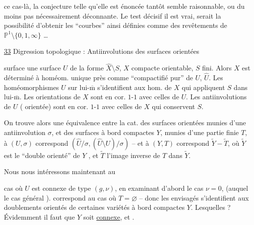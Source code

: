  ce cas-là, la conjecture telle qu'elle est énoncée tantôt semble raisonnable, ou du moins pas nécessairement déconnante. Le test décisif\unsure{,|,:} il est vrai, serait la possibilité d'obtenir les ``courbes'' ainsi définies comme des revêtements de $\mathbb{P}^1\setminus\{0,1,\infty\}$ \ldots


\uline{33} Digression topologique :
Antiinvolutions des surfaces orientées 


 surface  une surface $U$ de la forme $\widehat X\setminus S$, $X$  compacte orientable, $S$ fini. Alors $X$ est déterminé à homéom. unique près comme ``compactifié pur'' de $U$,  $\widehat U$.  Les homéomorphismes $U$ sur lui-$\overline{\mathrm m}$ s'identifient aux hom. de $X$ qui appliquent $S$ dans lui-$\overline{\mathrm m}$. Les orientations de $X$ sont en cor. $1$-$1$ avec celles de $U$. Les antiinvolutions de $U$ ( orientée) sont en cor. $1$-$1$ avec celles de $X$ qui conservent $S$.

On trouve alors une équivalence entre la cat. des surfaces orientées   munies d'une antiinvolution $\sigma$, et des surfaces à bord compactes $Y$, munies d'une partie finie $T$, à $(U,\sigma)$ correspond $(\widehat U/\sigma,(\widehat U\setminus U)/\sigma)$ -- et à $(Y,T)$ correspond $\widetilde Y-\widetilde T$, où $\widetilde Y$ est le ``double orienté'' de $Y$ , et $\widetilde T$ l'image inverse de $T$ dans $\widetilde Y$.

Nous nous intéressons maintenant au


cas où $U$ est connexe de type $(g,\nu)$, en examinant d'abord le cas $\nu=0$,  (auquel le cas général ).   correspond au cas où $T=\varnothing$ -- donc les   envisagés  s'identifient aux doublements orientés de certaines variétés à bord compactes $Y$. Lesquelles ? Évidemment il faut que $Y$ soit \uline{connexe}, et .

